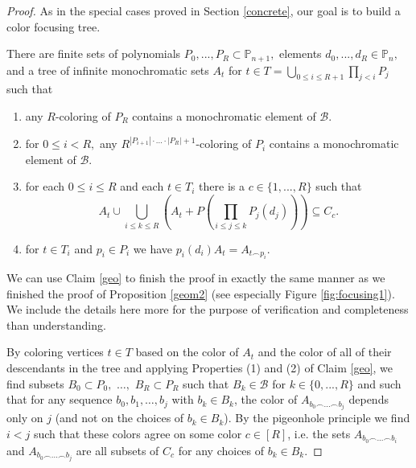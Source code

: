 \documentclass[tocmacros]{daj}
\begin{document}
\begin{proof}


As in the special cases proved in Section \ref{concrete}, our goal is to build a color focusing tree.

\begin{claim}\label{geo}
There are finite sets of polynomials $P_0,...,P_R\subset \mathbb{P}_{n+1},$ elements $d_0,...,d_R\in \mathbb{P}_n,$ and a tree of infinite monochromatic sets $A_t$ for $t\in T=\bigcup_{0\leq i\leq R+1}\prod_{j<i}P_{j}$ such that

\begin{enumerate}
    \item any $R$-coloring of ${P}_{R}$ contains a monochromatic element of $\mathcal{B}.$
    \item for $0\leq i<R,$ any $R^{|P_{i+1}|\cdot...\cdot|P_R|+1}$-coloring of $P_i$ contains a monochromatic element of $\mathcal{B}.$
    \item  for each $0\leq i\leq R$ and each $t\in T_i$ there is a $c\in \{1,...,R\}$ such that $$A_t\cup\bigcup_{i\leq k\leq R}(A_t+P(\prod_{i\leq j\leq k}P_j(d_j)))\subseteq C_c.$$
    \item for $t\in T_i$ and $p_i\in P_i$ we have $p_i(d_i)A_t=A_{t\smallfrown p_i}.$
\end{enumerate}
\end{claim}

We can use Claim \ref{geo} to finish the proof in exactly the same manner as we finished the proof of Proposition \ref{geom2} (see especially Figure \ref{fig:focusing1}).  We include the details here more for the purpose of verification and completeness than understanding.

By coloring vertices $t\in T$ based on the color of $A_t$ and the color of all of their descendants in the tree and applying Properties (1) and (2) of Claim \ref{geo}, we find subsets $B_0\subset P_0,$ $\ldots,$ $B_R\subset P_R$ such that $B_k\in\mathcal{B}$ for $k\in \{0,...,R\}$ and such that for any sequence $b_0,b_1,\ldots, b_j$ with $b_k\in B_k$, the color of $A_{b_0\smallfrown...\smallfrown b_j}$ depends only on $j$ (and not on the choices of $b_k\in B_k$).  By the pigeonhole principle we find $i<j$ such that these colors agree on some color $c\in [R]$, i.e. the sets $A_{b_0\smallfrown...\smallfrown b_i}$ and $A_{b_0\smallfrown...\smallfrown b_j}$ are all subsets of $C_c$ for any choices of $b_k\in B_k$.  


\end{proof}
\end{document}
